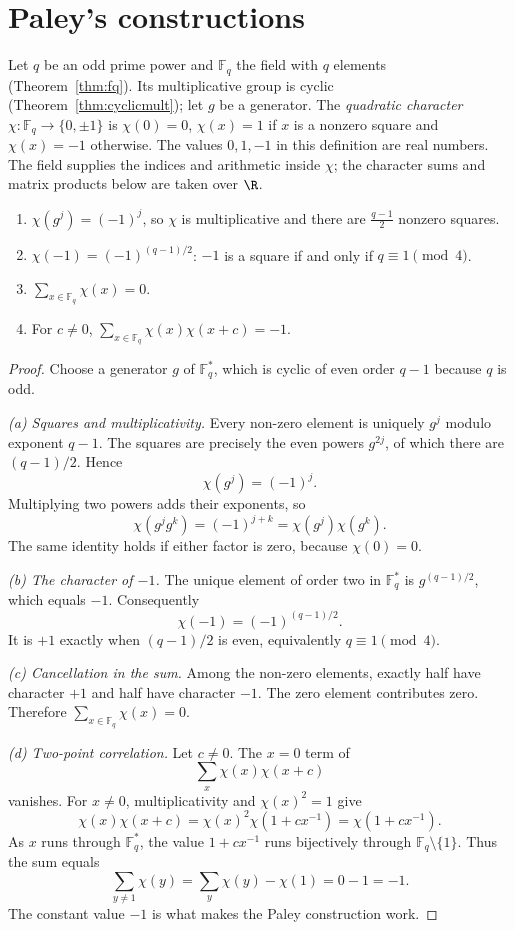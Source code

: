 \section{Paley's constructions}

Let $q$ be an odd prime power and $\mathbb F_q$ the field with $q$ elements (Theorem~\ref{thm:fq}). Its multiplicative group is cyclic (Theorem~\ref{thm:cyclicmult}); let $g$ be a generator. The \emph{quadratic character} $\chi:\mathbb F_q\to\{0,\pm1\}$ is $\chi(0)=0$, $\chi(x)=1$ if $x$ is a nonzero
square and $\chi(x)=-1$ otherwise. The values $0,1,-1$ in this definition
are real numbers. The field supplies the indices and arithmetic inside
$\chi$; the character sums and matrix products below are taken over $\R$.

\begin{lemma}\label{conjectures:lem:chi}
\begin{enumerate}
\item $\chi(g^j)=(-1)^j$, so $\chi$ is multiplicative and there are $\frac{q-1}2$ nonzero squares.
\item $\chi(-1)=(-1)^{(q-1)/2}$: $-1$ is a square if and only if $q\equiv1\pmod4$.
\item $\sum_{x\in\mathbb F_q}\chi(x)=0$.
\item For $c\neq0$, $\sum_{x\in\mathbb F_q}\chi(x)\chi(x+c)=-1$.
\end{enumerate}
\end{lemma}
\begin{proof}
Choose a generator $g$ of
$\mathbb F_q^*$, which is cyclic
of even order $q-1$ because $q$
is odd.

\emph{(a) Squares and multiplicativity.}
Every non-zero element is uniquely
$g^j$ modulo exponent $q-1$.
The squares are precisely the
even powers $g^{2j}$, of which
there are $(q-1)/2$. Hence
\[
\chi(g^j)=(-1)^j.
\]
Multiplying two powers adds their
exponents, so
\[
\chi(g^j g^k)=(-1)^{j+k}
=\chi(g^j)\chi(g^k).
\]
The same identity holds if either
factor is zero, because $\chi(0)=0$.

\emph{(b) The character of $-1$.}
The unique element of order two
in $\mathbb F_q^*$ is
$g^{(q-1)/2}$, which equals $-1$.
Consequently
\[
\chi(-1)=(-1)^{(q-1)/2}.
\]
It is $+1$ exactly when
$(q-1)/2$ is even, equivalently
$q\equiv1\pmod4$.

\emph{(c) Cancellation in the sum.}
Among the non-zero elements,
exactly half have character $+1$
and half have character $-1$.
The zero element contributes zero.
Therefore $\sum_{x\in\mathbb F_q}\chi(x)=0$.

\emph{(d) Two-point correlation.}
Let $c\ne0$. The $x=0$ term of
\[
\sum_x\chi(x)\chi(x+c)
\]
vanishes. For $x\ne0$,
multiplicativity and $\chi(x)^2=1$
give
\[
\chi(x)\chi(x+c)
=\chi(x)^2\chi(1+cx^{-1})
=\chi(1+cx^{-1}).
\]
As $x$ runs through $\mathbb F_q^*$,
the value $1+cx^{-1}$ runs bijectively
through $\mathbb F_q\setminus\{1\}$.
Thus the sum equals
\[
\sum_{y\ne1}\chi(y)
=\sum_y\chi(y)-\chi(1)=0-1=\boxed{-1}.
\]
The constant value $-1$ is
what makes the Paley construction work.
\end{proof}

